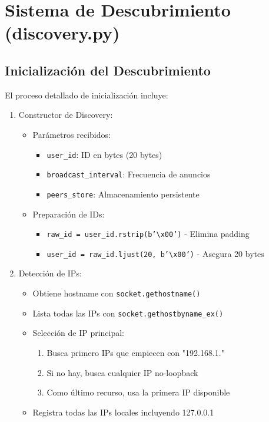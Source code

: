 \documentclass[12pt]{article}
\begin{document}
\section{Sistema de Descubrimiento (discovery.py)}
\subsection{Inicialización del Descubrimiento}
El proceso detallado de inicialización incluye:

\begin{enumerate}
    \item Constructor de Discovery:
    \begin{itemize}
        \item Parámetros recibidos:
        \begin{itemize}
            \item \texttt{user\_id}: ID en bytes (20 bytes)
            \item \texttt{broadcast\_interval}: Frecuencia de anuncios
            \item \texttt{peers\_store}: Almacenamiento persistente
        \end{itemize}
        \item Preparación de IDs:
        \begin{itemize}
            \item \texttt{raw\_id = user\_id.rstrip(b'\textbackslash x00')} - Elimina padding
            \item \texttt{user\_id = raw\_id.ljust(20, b'\textbackslash x00')} - Asegura 20 bytes
        \end{itemize}
    \end{itemize}

    \item Detección de IPs:
    \begin{itemize}
        \item Obtiene hostname con \texttt{socket.gethostname()}
        \item Lista todas las IPs con \texttt{socket.gethostbyname\_ex()}
        \item Selección de IP principal:
        \begin{enumerate}
            \item Busca primero IPs que empiecen con "192.168.1."
            \item Si no hay, busca cualquier IP no-loopback
            \item Como último recurso, usa la primera IP disponible
        \end{enumerate}
        \item Registra todas las IPs locales incluyendo 127.0.0.1
    \end{itemize}


\end{enumerate}
\end{document}
